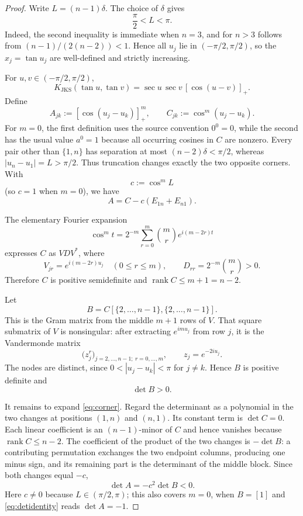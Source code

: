 \documentclass[11pt]{article}
\newcommand{\JKS}{\mathrm{JKS}}
\newcommand{\pos}[1]{[#1]_+}
\begin{document}
\begin{proof}
Write $L=(n-1)\delta$.  The choice of $\delta$ gives
\[
 \frac\pi2<L<\pi.
\]
Indeed, the second inequality is immediate when $n=3$, and for $n>3$ follows
from $(n-1)/(2(n-2))<1$.  Hence all $u_j$ lie in $(-\pi/2,\pi/2)$, so the
$x_j=\tan u_j$ are well-defined and strictly increasing.

For $u,v\in(-\pi/2,\pi/2)$,
\begin{equation}\label{eq:tan}
 K_{\JKS}(\tan u,\tan v)
 =\sec u\,\sec v\,\pos{\cos(u-v)}.
\end{equation}
Define
\[
 A_{jk}:=\pos{\cos(u_j-u_k)}^m,
 \qquad
 C_{jk}:=\cos^m(u_j-u_k).
\]
For $m=0$, the first definition uses the source convention $0^0=0$, while
the second has the usual value $a^0=1$ because all occurring cosines in $C$
are nonzero.  Every pair other than $\{1,n\}$ has separation at most
$(n-2)\delta<\pi/2$, whereas $|u_n-u_1|=L>\pi/2$.  Thus truncation changes
exactly the two opposite corners.  With
\[
 c:=\cos^m L
\]
(so $c=1$ when $m=0$), we have
\begin{equation}\label{eq:corner}
 A=C-c(E_{1n}+E_{n1}).
\end{equation}

The elementary Fourier expansion
\begin{equation}\label{eq:fourier}
 \cos^m t=2^{-m}\sum_{r=0}^m \binom mr e^{i(m-2r)t}
\end{equation}
expresses $C$ as $VDV^*$, where
\[
 V_{jr}=e^{i(m-2r)u_j}\quad(0\leq r\leq m),
 \qquad
 D_{rr}=2^{-m}\binom mr>0.
\]
Therefore $C$ is positive semidefinite and $\operatorname{rank}C\leq m+1=n-2$.

Let
\[
 B=C[\{2,\ldots,n-1\},\{2,\ldots,n-1\}].
\]
This is the Gram matrix from the middle $m+1$ rows of $V$.  That square
submatrix of $V$ is nonsingular: after extracting $e^{imu_j}$ from row $j$,
it is the Vandermonde matrix
\[
 \bigl(z_j^r\bigr)_{j=2,\ldots,n-1;\ r=0,\ldots,m},
 \qquad z_j=e^{-2iu_j}.
\]
The nodes are distinct, since $0<|u_j-u_k|<\pi$ for $j\ne k$.  Hence
$B$ is positive definite and
\begin{equation}\label{eq:Bpositive}
 \det B>0.
\end{equation}

It remains to expand \eqref{eq:corner}.  Regard the determinant as a polynomial
in the two changes at positions $(1,n)$ and $(n,1)$.  Its constant term is
$\det C=0$.  Each linear coefficient is an $(n-1)$-minor of $C$ and hence
vanishes because $\operatorname{rank}C\leq n-2$.  The coefficient of the
product of the two changes is $-\det B$: a contributing permutation exchanges
the two endpoint columns, producing one minus sign, and its remaining part is
the determinant of the middle block.  Since both changes equal $-c$,
\begin{equation}\label{eq:detidentity}
 \det A=-c^2\det B<0.
\end{equation}
Here $c\ne0$ because $L\in(\pi/2,\pi)$; this also covers $m=0$, when
$B=[1]$ and \eqref{eq:detidentity} reads $\det A=-1$.


\end{proof}
\end{document}
